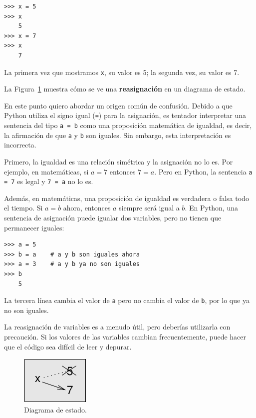 \documentclass[10pt]{book}
\begin{document}
\begin{verbatim}
>>> x = 5
>>> x
    5
>>> x = 7
>>> x
    7
\end{verbatim}
%
La primera vez que mostramos
{\tt x}, su valor es 5; la segunda vez, su
valor es 7.

La Figura~\ref{fig.assign2} muestra cómo se ve una {\bf reasignación}
en un diagrama de estado.  

En este punto quiero abordar un origen común de
confusión.
Debido a que Python utiliza el signo igual ({\tt =}) para la asignación, es
tentador interpretar una sentencia del tipo {\tt a = b} como una
proposición
matemática de igualdad, es decir, la afirmación de que {\tt a} y
{\tt b} son iguales.  Sin embargo, esta interpretación es incorrecta.

Primero, la igualdad es una relación simétrica y la asignación no lo es.  Por
ejemplo, en matemáticas, si $a=7$ entonces $7=a$.  Pero en Python, la
sentencia {\tt a = 7} es legal y {\tt 7 = a} no lo es.

Además, en matemáticas, una proposición de igualdad es verdadera o
falsa todo el tiempo.  Si $a=b$ ahora, entonces $a$ siempre será igual a $b$.
En Python, una sentencia de asignación puede igualar dos variables, pero
no tienen que permanecer iguales:

\begin{verbatim}
>>> a = 5
>>> b = a    # a y b son iguales ahora
>>> a = 3    # a y b ya no son iguales
>>> b
    5
\end{verbatim}
%
La tercera línea cambia el valor de {\tt a} pero no cambia el
valor de {\tt b}, por lo que ya no son iguales.

La reasignación de variables es a menudo útil, pero deberías utilizarla
con precaución.  Si los valores de las variables cambian frecuentemente, puede
hacer que el código sea difícil de leer y depurar.

\begin{figure}
\centerline
{\includegraphics[scale=0.8]{figs/assign2.pdf}}
\caption{Diagrama de estado.}
\label{fig.assign2}
\end{figure}
\end{document}
